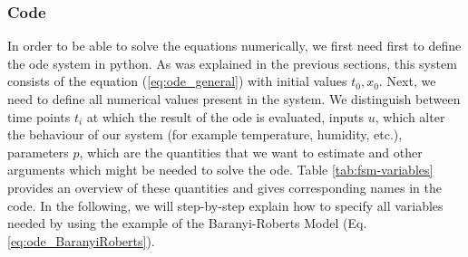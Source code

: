\documentclass[10pt,A4paper]{article}
\begin{document}
\subsubsection*{Code}
In order to be able to solve the equations numerically, we first need first to define the \ac{ode} system in python.
As was explained in the previous sections, this system consists of the equation (\ref{eq:ode_general}) with initial values $t_0,x_0$.
Next, we need to define all numerical values present in the system.
We distinguish between time points $t_i$ at which the result of the \ac{ode} is evaluated, inputs $u$, which alter the behaviour of our system (for example temperature, humidity, etc.), parameters $p$, which are the quantities that we want to estimate and other arguments which might be needed to solve the \ac{ode}.
Table \ref{tab:fsm-variables} provides an overview of these quantities and gives corresponding names in the code.
In the following, we will step-by-step explain how to specify all variables needed by using the example of the Baranyi-Roberts Model (Eq. \ref{eq:ode_BaranyiRoberts}).
\end{document}

